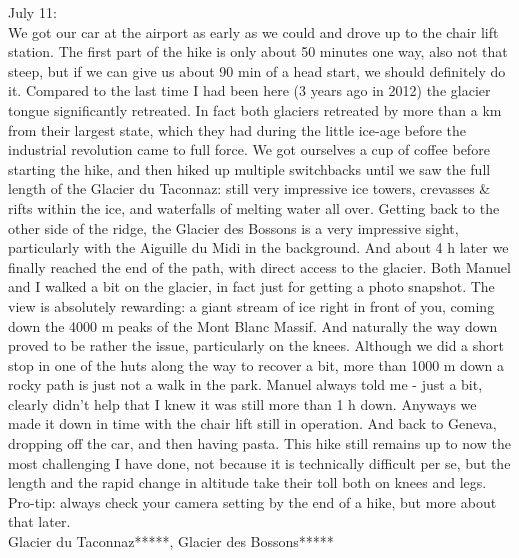 July 11:\\
We got our car at the airport as early as we could and drove up to the chair lift station. The first part of the hike is only about 50 minutes one way, also not that steep, but if we can give us about 90 min of a head start, we should definitely do it. Compared to the last time I had been here (3 years ago in 2012) the glacier tongue significantly retreated. In fact both glaciers retreated by more than a km from their largest state, which they had during the little ice-age before the industrial revolution came to full force. We got ourselves a cup of coffee before starting the hike, and then hiked up multiple switchbacks until we saw the full length of the Glacier du Taconnaz: still very impressive ice towers, crevasses \& rifts within the ice, and waterfalls of melting water all over. Getting back to the other side of the ridge, the Glacier des Bossons is a very impressive sight, particularly with the Aiguille du Midi in the background. And about 4 h later we finally reached the end of the path, with direct access to the glacier. Both Manuel and I walked a bit on the glacier, in fact just for getting a photo snapshot. The view is absolutely rewarding: a giant stream of ice right in front of you, coming down the 4000 m peaks of the Mont Blanc Massif. And naturally the way down proved to be rather the issue, particularly on the knees. Although we did a short stop in one of the huts along the way to recover a bit, more than 1000 m down a rocky path is just not a walk in the park. Manuel always told me - just a bit, clearly didn't help that I knew it was still more than 1 h down. Anyways we made it down in time with the chair lift still in operation. And back to Geneva, dropping off the car, and then having pasta. This hike still remains up to now the most challenging I have done, not because it is technically difficult per se, but the length and the rapid change in altitude take their toll both on knees and legs. Pro-tip: always check your camera setting by the end of a hike, but more about that later.\\

Glacier du Taconnaz*****, Glacier des Bossons*****


